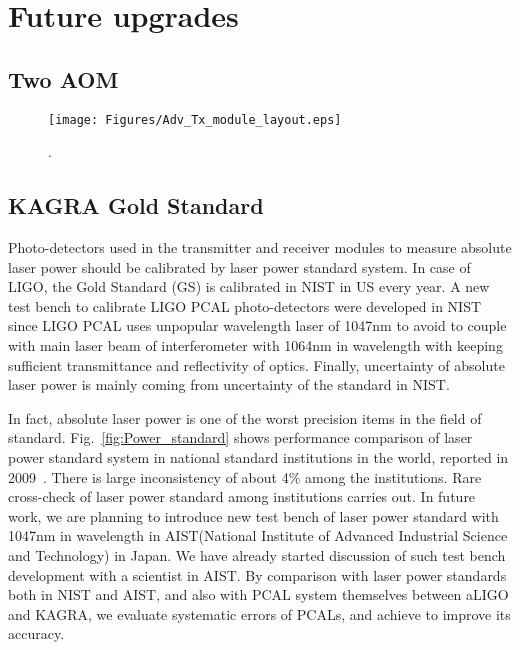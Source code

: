 
\chapter{Future upgrades} %

\label{Chapter7} %
\section{Two AOM}
\begin{figure}
\begin{center}
\texttt{[image: Figures/Adv\_Tx\_module\_layout.eps]}
\caption{.} 
\label{fig:Adv_Tx_module_layout} 
\end{center}
\end{figure}

\section{KAGRA Gold Standard}
Photo-detectors used in the transmitter and receiver modules to measure absolute laser power should be calibrated by laser power standard system. In case of LIGO, the Gold Standard (GS) is calibrated in NIST in US every year. A new test bench to calibrate LIGO PCAL photo-detectors were developed in NIST since LIGO PCAL uses unpopular wavelength laser of 1047nm to avoid to couple with main laser beam of interferometer with 1064nm in wavelength with keeping sufficient transmittance and reflectivity of optics. Finally, uncertainty of absolute laser power is mainly coming from uncertainty of the standard in NIST. 

In fact, absolute laser power is one of the worst precision items in the field of standard. Fig.~\ref{fig:Power_standard} shows performance comparison of laser power standard system in national standard institutions in the world, reported in 2009~\cite{EUROMET}. There is large inconsistency of about 4\% among the institutions. Rare cross-check of laser power standard among institutions carries out. In future work, we are planning to introduce new test bench of laser power standard with 1047nm in wavelength in AIST(National Institute of Advanced Industrial Science and Technology)  in Japan. We have already started discussion of such test bench development with a scientist in AIST. By comparison with laser power standards both in NIST and AIST, and also with PCAL system themselves between aLIGO and KAGRA, we evaluate systematic errors of PCALs, and achieve to improve its accuracy.


